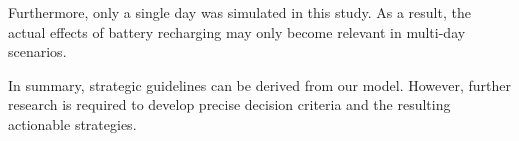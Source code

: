 Furthermore, only a single day was simulated in this study.
As a result, the actual effects of battery recharging may only become relevant in multi-day scenarios.

In summary, strategic guidelines can be derived from our model.
However, further research is required to develop precise decision criteria
and the resulting actionable strategies.\todo{!!!!!!}


